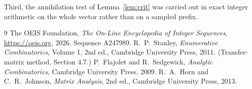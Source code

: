 \documentclass[11pt,a4paper]{article}
\theoremstyle{plain}
\theoremstyle{definition}
\begin{document}
Third, the annihilation test of Lemma~\ref{lem:crit} was carried out in exact integer
arithmetic on the whole vector rather than on a sampled prefix.

\begin{thebibliography}{9}
 The OEIS Foundation, \emph{The On-Line Encyclopedia of Integer
Sequences}, \url{https://oeis.org}, 2026. Sequence A247989.
 R.~P.~Stanley, \emph{Enumerative Combinatorics}, Volume 1, 2nd ed.,
Cambridge University Press, 2011. (Transfer-matrix method, Section 4.7.)
 P.~Flajolet and R.~Sedgewick, \emph{Analytic Combinatorics}, Cambridge
University Press, 2009.
 R.~A.~Horn and C.~R.~Johnson, \emph{Matrix Analysis}, 2nd ed., Cambridge
University Press, 2013.
\end{thebibliography}
\end{document}
